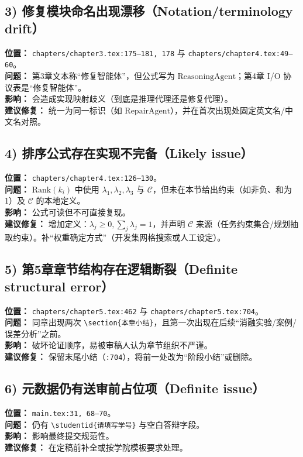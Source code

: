\documentclass[12pt]{ctexart}
\begin{document}
\subsection*{3) 修复模块命名出现漂移（Notation/terminology drift）}
\textbf{位置：} \texttt{chapters/chapter3.tex:175--181, 178} 与 \texttt{chapters/chapter4.tex:49--60}。\\
\textbf{问题：} 第3章文本称“修复智能体”，但公式写为 \(\mathrm{ReasoningAgent}\)；第4章 I/O 协议表是“修复智能体”。\\
\textbf{影响：} 会造成实现映射歧义（到底是推理代理还是修复代理）。\\
\textbf{建议修复：} 统一为同一标识（如 \(\mathrm{RepairAgent}\)），并在首次出现处固定英文名/中文名对照。

\subsection*{4) 排序公式存在实现不完备（Likely issue）}
\textbf{位置：} \texttt{chapters/chapter4.tex:126--130}。\\
\textbf{问题：} \(\mathrm{Rank}(k_i)\) 中使用 \(\lambda_1,\lambda_2,\lambda_3\) 与 \(\mathcal{C}\)，但未在本节给出约束（如非负、和为1）及 \(\mathcal{C}\) 的本地定义。\\
\textbf{影响：} 公式可读但不可直接复现。\\
\textbf{建议修复：} 增加定义：\(\lambda_j\ge 0,\sum_j \lambda_j=1\)，并声明 \(\mathcal{C}\) 来源（任务约束集合/规划抽取约束）。补“权重确定方式”（开发集网格搜索或人工设定）。

\subsection*{5) 第5章章节结构存在逻辑断裂（Definite structural error）}
\textbf{位置：} \texttt{chapters/chapter5.tex:462} 与 \texttt{chapters/chapter5.tex:704}。\\
\textbf{问题：} 同章出现两次 \texttt{\textbackslash section\{本章小结\}}，且第一次出现在后续“消融实验/案例/误差分析”之前。\\
\textbf{影响：} 破坏论证顺序，易被审稿人认为章节组织不严谨。\\
\textbf{建议修复：} 保留末尾小结（\texttt{:704}），将前一处改为“阶段小结”或删除。

\subsection*{6) 元数据仍有送审前占位项（Definite issue）}
\textbf{位置：} \texttt{main.tex:31, 68--70}。\\
\textbf{问题：} 仍有 \texttt{\textbackslash studentid\{请填写学号\}} 与空白答辩字段。\\
\textbf{影响：} 影响最终提交规范性。\\
\textbf{建议修复：} 在定稿前补全或按学院模板要求处理。
\end{document}
